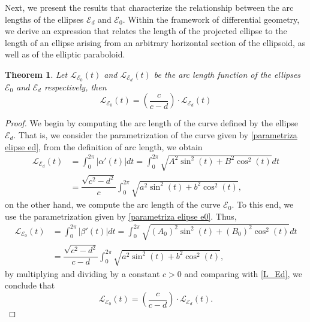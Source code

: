 \documentclass{amsart}
\theoremstyle{plain}
\newtheorem{theorem}{\bf Theorem}
\numberwithin{equation}{section}
\begin{document}
\begin{center}
	\centering
	\footnotesize
\end{center}

Next, we present the results that characterize the relationship between the arc lengths of the ellipses $\mathcal{E}_d$ and $\mathcal{E}_0$. Within the framework of differential geometry, we derive an expression that relates the length of the projected ellipse to the length of an ellipse arising from an arbitrary horizontal section of the ellipsoid, as well as of the elliptic paraboloid.

\begin{theorem}\label{teorema5}
	Let \( \mathcal{L}_{\mathcal{E}_0}(t) \) and \( \mathcal{L}_{\mathcal{E}_d}(t) \) be the arc length function of the ellipses \( \mathcal{E}_0 \) and \( \mathcal{E}_d \) respectively, then
	\begin{equation}
		\mathcal{L}_{\mathcal{E}_0}(t) = \left(\frac{c}{c-d} \right) \cdot \mathcal{L}_{\mathcal{E}_d}(t)
	\end{equation}
\end{theorem}

\begin{proof}
	We begin by computing the arc length of the curve defined by the ellipse $\mathcal{E}_d$. That is, we consider the parametrization of the curve given by \eqref{parametriza elipse ed}, from the definition of arc length, we obtain
	\begin{align}\label{L_Ed}
		\mathcal{L}_{\mathcal{E}_d}(t) & = \int_{0}^{2\pi} |\alpha'(t)|dt = \int_0^{2\pi} \sqrt{ A^2 \sin^2(t) + B^2 \cos^2(t) } dt \nonumber \\
		& =  \dfrac{\sqrt{c^2 - d^2}}{c} \int_0^{2\pi} \sqrt{ a^2 \sin^2(t) + b^2 \cos^2(t) },
	\end{align}
	on the other hand, we compute the arc length of the curve $\mathcal{E}_0$. To this end, we use the parametrization given by \eqref{parametriza elipse e0}. Thus,
	\begin{align}\label{L_E0}
		\mathcal{L}_{\mathcal{E}_0}(t) & = \int_{0}^{2\pi} |\beta'(t)|dt = \int_0^{2\pi} \sqrt{ (A_0)^2 \sin^2(t) + (B_0)^2 \cos^2(t) } dt \nonumber \\
		& =  \dfrac{\sqrt{c^2 - d^2}}{c-d} \int_0^{2\pi} \sqrt{ a^2 \sin^2(t) + b^2 \cos^2(t) },
	\end{align}
	by multiplying and dividing by a constant $c>0$ and comparing with \eqref{L_Ed}, we conclude that
	$$
	\mathcal{L}_{\mathcal{E}_0}(t) = \left( \frac{c}{c-d} \right) \cdot \mathcal{L}_{\mathcal{E}_d}(t).
	$$
	
\end{proof}
\end{document}
